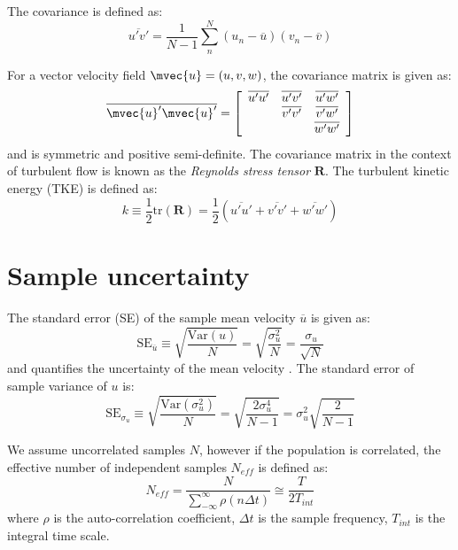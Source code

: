  The covariance is defined as:
\begin{equation}
\overline{u'v'} = \frac{1}{N-1} \sum_n^N \left(u_n - \overline{u} \right) \left(v_n - \overline{v} \right)
\end{equation}

For a vector velocity field $\mvec{u} = (u,v,w)$, the covariance matrix is given as:
\begin{equation}
\overline{\mvec{u}'\mvec{u}'} = \left[ {\begin{array}{*{20}{c}}
{\overline{u'u'}}&{\overline{u'v'}}&{\overline{u'w'}}\\
{}&{\overline{v'v'}}&{\overline{v'w'}}\\
{}&{}&{\overline{w'w'}}
\end{array}} \right]
\end{equation}
and is symmetric and positive semi-definite. The covariance matrix in the context of turbulent flow is known as the \textit{Reynolds stress tensor} $\mathbf{R}$. The turbulent kinetic energy (TKE) is defined as:
\begin{equation}
k \equiv \frac{1}{2} \mathrm{tr} \left(\mathbf{R}\right) = \frac{1}{2} \left(\overline{u'u'} + \overline{v'v'} + \overline{w'w'}\right)
\end{equation}

\section*{Sample uncertainty}

The standard error (SE) of the sample mean velocity $\overline{u}$ is given as:
\begin{equation}
\mathrm{SE}_{\overline{u}} \equiv \sqrt{\frac{\mathrm{Var}\left(u\right)}{N}} = \sqrt{\frac{\sigma_u^2}{N}} = \frac{\sigma_u}{\sqrt{N}}
\end{equation}
and quantifies the uncertainty of the mean velocity \citep{Wieneke2017}. The standard error of sample variance of $u$ is:
\begin{equation}
\mathrm{SE}_{\sigma_{u}} \equiv \sqrt{\frac{\mathrm{Var}\left(\sigma_{u}^2\right)}{N}} = \sqrt{\frac{2\sigma_{u}^4}{N-1}} = \sigma_{u}^2 \sqrt{\frac{2}{N-1}}
\end{equation}

We assume uncorrelated samples $N$, however if the population is correlated, the effective number of independent samples $N_{\textit{eff}}$ is defined as:
\begin{equation}
N_{\textit{eff}} = \frac{N}{\sum_{-\infty}^{\infty} \rho \left(n \Delta t\right)} \cong \frac{T}{2 T_{\textit{int}}}
\end{equation}
where $\rho$ is the auto-correlation coefficient, $\Delta t$ is the sample frequency, $T_{\textit{int}}$ is the integral time scale.

